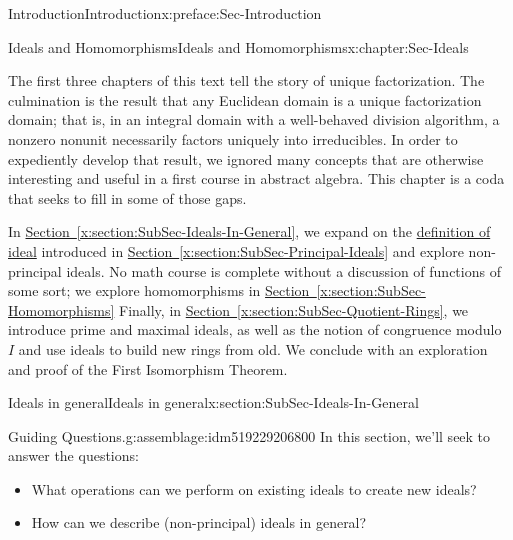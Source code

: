 \documentclass[oneside,10pt,]{book}
\newcommand{\xreffont}{\relax}
\numberwithin{equation}{section}
\begin{document}
\begin{preface}{Introduction}{}{Introduction}{}{}{x:preface:Sec-Introduction}
\typeout{************************************************}
\typeout{************************************************}
%
\begin{chapterptx}{Ideals and Homomorphisms}{}{Ideals and Homomorphisms}{}{}{x:chapter:Sec-Ideals}
\begin{introduction}{}%
The first three chapters of this text tell the story of unique factorization. The culmination is the result that any Euclidean domain is a unique factorization domain; that is, in an integral domain with a well-behaved division algorithm, a nonzero nonunit necessarily factors uniquely into irreducibles. In order to expediently develop that result, we ignored many concepts that are otherwise interesting and useful in a first course in abstract algebra. This chapter is a coda that seeks to fill in some of those gaps.%
\par
In \hyperref[x:section:SubSec-Ideals-In-General]{Section~{\xreffont\ref{x:section:SubSec-Ideals-In-General}}}, we expand on the \hyperref[x:definition:def-ideal]{definition of ideal} introduced in \hyperref[x:section:SubSec-Principal-Ideals]{Section~{\xreffont\ref{x:section:SubSec-Principal-Ideals}}} and explore non-principal ideals. No math course is complete without a discussion of functions of some sort; we explore homomorphisms in \hyperref[x:section:SubSec-Homomorphisms]{Section~{\xreffont\ref{x:section:SubSec-Homomorphisms}}} Finally, in \hyperref[x:section:SubSec-Quotient-Rings]{Section~{\xreffont\ref{x:section:SubSec-Quotient-Rings}}}, we introduce prime and maximal ideals, as well as the notion of congruence modulo \(I\) and use ideals to build new rings from old. We conclude with an exploration and proof of the First Isomorphism Theorem.%
\end{introduction}%
%
%
\typeout{************************************************}
\typeout{************************************************}
%
\begin{sectionptx}{Ideals in general}{}{Ideals in general}{}{}{x:section:SubSec-Ideals-In-General}
\begin{assemblage}{Guiding Questions.}{g:assemblage:idm519229206800}%
In this section, we'll seek to answer the questions: %
\begin{itemize}[label=\textbullet]
\item{}What operations can we perform on existing ideals to create new ideals?%
\item{}How can we describe (non-principal) ideals in general?%

\end{itemize}
\end{assemblage}
\end{sectionptx}
\end{chapterptx}
\end{preface}
\end{document}
